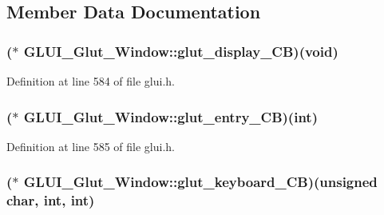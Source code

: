 \subsection{Member Data Documentation}
\hypertarget{class_g_l_u_i___glut___window_a08233e5acd66dc19bf453e423b0cd6c9}{
\subsubsection[{glut\+\_\+display\+\_\+\+C\+B}]{($\ast$ G\+L\+U\+I\+\_\+\+Glut\+\_\+\+Window\+::glut\+\_\+display\+\_\+\+C\+B)({\bf void})}}\label{class_g_l_u_i___glut___window_a08233e5acd66dc19bf453e423b0cd6c9}


Definition at line 584 of file glui.\+h.

\hypertarget{class_g_l_u_i___glut___window_a0f17b9ee70f25c694dfb546b0d2ae6a8}{
\subsubsection[{glut\+\_\+entry\+\_\+\+C\+B}]{($\ast$ G\+L\+U\+I\+\_\+\+Glut\+\_\+\+Window\+::glut\+\_\+entry\+\_\+\+C\+B)({\bf int})}}\label{class_g_l_u_i___glut___window_a0f17b9ee70f25c694dfb546b0d2ae6a8}


Definition at line 585 of file glui.\+h.

\hypertarget{class_g_l_u_i___glut___window_a299ae81dcf534d460bac55a897cf540b}{
\subsubsection[{glut\+\_\+keyboard\+\_\+\+C\+B}]{($\ast$ G\+L\+U\+I\+\_\+\+Glut\+\_\+\+Window\+::glut\+\_\+keyboard\+\_\+\+C\+B)(unsigned char, {\bf int}, {\bf int})}}\label{class_g_l_u_i___glut___window_a299ae81dcf534d460bac55a897cf540b}


